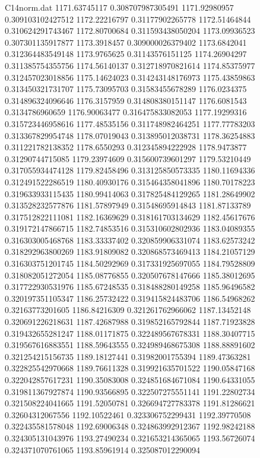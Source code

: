 \begin{filecontents}{C14norm.dat}
1171.63745117			0.308707987305491
1171.92980957			0.309103102427512
1172.22216797			0.31177902265778
1172.51464844			0.310624291743467
1172.80700684			0.311593438050204
1173.09936523			0.307301135917877
1173.3918457			0.309000026379402
1173.6842041			0.312364483549148
1173.9765625			0.31143576151125
1174.26904297			0.311385754355756
1174.56140137			0.312718970821614
1174.85375977			0.312457023018856
1175.14624023			0.314243148176973
1175.43859863			0.313450321731707
1175.73095703			0.31583455678289
1176.0234375			0.314896324096646
1176.3157959			0.314808380151147
1176.6081543			0.3134786960659
1176.90063477			0.316475833082053
1177.19299316			0.315723446958616
1177.48535156			0.311748982464251
1177.77783203			0.313367829954748
1178.07019043			0.313895012038731
1178.36254883			0.311221782138352
1178.6550293			0.312345894222928
1178.9473877			0.31290744715085
1179.23974609			0.315600739601297
1179.53210449			0.317055934474128
1179.82458496			0.313125850573335
1180.11694336			0.312491522286519
1180.40930176			0.315464358041896
1180.70178223			0.319633933115435
1180.99414063			0.317825484129265
1181.28649902			0.313528232577876
1181.57897949			0.31548695914843
1181.87133789			0.317512822111081
1182.16369629			0.318161703134629
1182.45617676			0.319172147866715
1182.74853516			0.315310602802936
1183.04089355			0.316303005468768
1183.33337402			0.320859906331074
1183.62573242			0.318292963800269
1183.91809082			0.320868573469413
1184.21057129			0.316303751201745
1184.50292969			0.317331925697055
1184.79528809			0.318082051272054
1185.08776855			0.320507678147666
1185.38012695			0.317722930531976
1185.67248535			0.318488280149258
1185.96496582			0.320197351105347
1186.25732422			0.319415824483706
1186.54968262			0.32163773201605
1186.84216309			0.321261762966062
1187.13452148			0.320691226218631
1187.42687988			0.319852165792844
1187.71923828			0.319432655281247
1188.01171875			0.322489567678331
1188.30407715			0.319567616883551
1188.59643555			0.324989468675308
1188.88891602			0.321254215156735
1189.18127441			0.31982001755394
1189.47363281			0.322825542970668
1189.76611328			0.319921635701522
1190.05847168			0.322042857617231
1190.35083008			0.324851684671084
1190.64331055			0.319811367927874
1190.93566895			0.322507275551141
1191.22802734			0.321508224041665
1191.52050781			0.326694727783378
1191.81286621			0.32604312067556
1192.10522461			0.323306752299431
1192.39770508			0.322435581578048
1192.69006348			0.324863992912367
1192.98242188			0.324305131043976
1193.27490234			0.321653214365065
1193.56726074			0.324371070761065
1193.85961914			0.325087012290094

\end{filecontents}
